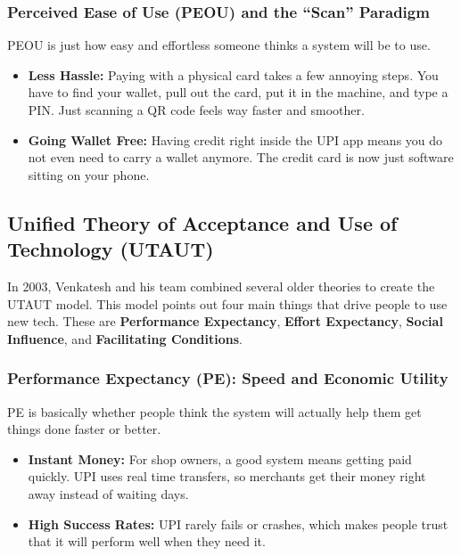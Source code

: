 \subsubsection{Perceived Ease of Use (PEOU) and the ``Scan'' Paradigm}

PEOU is just how easy and effortless someone thinks a system will be to use.

\begin{itemize}
    \item \textbf{Less Hassle:} Paying with a physical card takes a few annoying steps. You have to find your wallet, pull out the card, put it in the machine, and type a PIN. Just scanning a QR code feels way faster and smoother.
    \item \textbf{Going Wallet Free:} Having credit right inside the UPI app means you do not even need to carry a wallet anymore. The credit card is now just software sitting on your phone.
\end{itemize}

\subsection{Unified Theory of Acceptance and Use of Technology (UTAUT)}

In 2003, Venkatesh and his team combined several older theories to create the UTAUT model. This model points out four main things that drive people to use new tech. These are \textbf{Performance Expectancy}, \textbf{Effort Expectancy}, \textbf{Social Influence}, and \textbf{Facilitating Conditions}.

\subsubsection{Performance Expectancy (PE): Speed and Economic Utility}

PE is basically whether people think the system will actually help them get things done faster or better.

\begin{itemize}
    \item \textbf{Instant Money:} For shop owners, a good system means getting paid quickly. UPI uses real time transfers, so merchants get their money right away instead of waiting days.
    \item \textbf{High Success Rates:} UPI rarely fails or crashes, which makes people trust that it will perform well when they need it.
\end{itemize}

